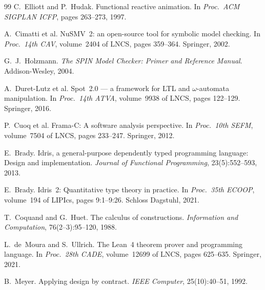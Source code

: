 \documentclass[11pt,a4paper]{article}
\begin{document}
\begin{thebibliography}{99}
C.~Elliott and P.~Hudak.
\newblock Functional reactive animation.
\newblock In \emph{Proc.\ ACM SIGPLAN ICFP}, pages 263--273, 1997.

A.~Cimatti et al.
\newblock NuSMV~2: an open-source tool for symbolic model checking.
\newblock In \emph{Proc.\ 14th CAV}, volume~2404 of LNCS, pages 359--364.
  Springer, 2002.

G.~J.~Holzmann.
\newblock \emph{The SPIN Model Checker: Primer and Reference Manual}.
\newblock Addison-Wesley, 2004.

A.~Duret-Lutz et al.
\newblock Spot~2.0 --- a framework for LTL and $\omega$-automata manipulation.
\newblock In \emph{Proc.\ 14th ATVA}, volume~9938 of LNCS, pages 122--129.
  Springer, 2016.

P.~Cuoq et al.
\newblock Frama-C: A software analysis perspective.
\newblock In \emph{Proc.\ 10th SEFM}, volume~7504 of LNCS, pages 233--247.
  Springer, 2012.

E.~Brady.
\newblock Idris, a general-purpose dependently typed programming language:
  Design and implementation.
\newblock \emph{Journal of Functional Programming}, 23(5):552--593, 2013.

E.~Brady.
\newblock Idris~2: Quantitative type theory in practice.
\newblock In \emph{Proc.\ 35th ECOOP}, volume~194 of LIPIcs, pages 9:1--9:26.
  Schloss Dagstuhl, 2021.

T.~Coquand and G.~Huet.
\newblock The calculus of constructions.
\newblock \emph{Information and Computation}, 76(2--3):95--120, 1988.

L.~de~Moura and S.~Ullrich.
\newblock The Lean~4 theorem prover and programming language.
\newblock In \emph{Proc.\ 28th CADE}, volume~12699 of LNCS, pages 625--635.
  Springer, 2021.

B.~Meyer.
\newblock Applying design by contract.
\newblock \emph{IEEE Computer}, 25(10):40--51, 1992.

\end{thebibliography}
\end{document}
